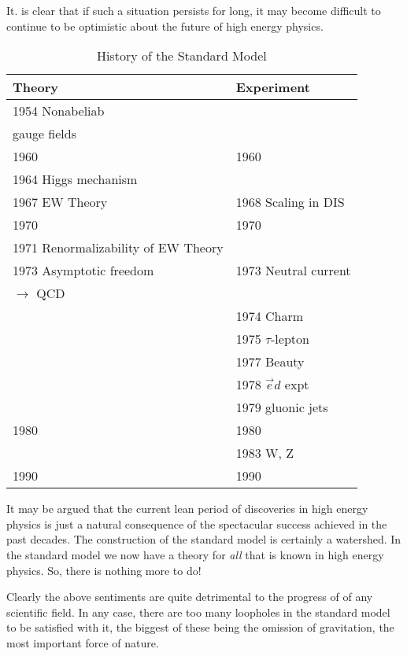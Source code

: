 It. is clear that if such a situation persists for long, it may become difficult to continue
to be optimistic about the future of high energy physics.
\setcounter{chapter}{0}
\begin{center}
\begin{table}[h]
\caption{History of the Standard Model}
\begin{tabular}{|l|l|}
\hline
{\textbf Theory} & {\textbf Experiment}\\
\hline
1954 Nonabeliab & \\
gauge fields & \\
1960 & 1960\\
1964 Higgs mechanism & \\
1967 EW Theory & 1968 Scaling in DIS \\
1970 & 1970\\
1971 Renormalizability of EW Theory& \\
1973 Asymptotic freedom & 1973 Neutral current\\
$\rightarrow$ QCD & \\
 & 1974 Charm\\
 & 1975 $\tau$-lepton\\
 & 1977 Beauty \\
 & 1978 $\vec{e} d$ expt\\
 & 1979 gluonic jets\\
 1980 & 1980\\
 & 1983 W, Z\\
 1990 & 1990\\
 \hline 
\end{tabular}
\end{table}
\end{center}

It may be argued that the current lean period of discoveries in high energy physics is
just a natural consequence of the spectacular success achieved in the past decades. The construction of the standard model is certainly a watershed. In the standard model we
now have a theory for {\it all} that is known in high energy physics. So, there is nothing more
to do!


Clearly the above sentiments are quite detrimental to the progress of of any scientific
field. In any case, there are too many loopholes in the standard model to be satisfied
with it, the biggest of these being the omission of gravitation, the most important force
of nature.


